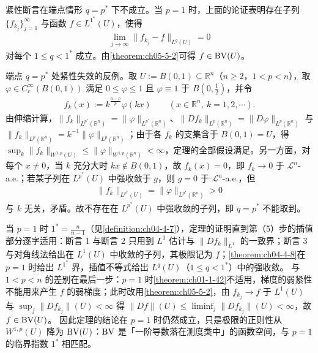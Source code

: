 ﻿\documentclass[../../main.tex]{subfiles}%
\begin{document}
\begin{remark}\label{remark:ch04-thm-4-11-端点}
紧性断言在端点情形 $q=p^*$ 下不成立。当 $p=1$ 时，上面的论证表明存在子列 $\{f_{k_j}\}_{j=1}^{\infty}$ 与函数 $f\in L^{1^*}(U)$，使得
\begin{align*}
\lim_{j\to\infty}\lVert f_{k_j}-f\rVert_{L^q(U)}=0
\end{align*}
对每个 $1\leqslant q<1^*$ 成立。由\cref{theorem:ch05-5-2}可得 $f\in\mathrm{BV}(U)$。%
\end{remark}

\begin{remark}\label{remark:ch04-thm-4-11-端点例}
端点 $q=p^*$ 处紧性失效的反例。取 $U:=B(0,1)\subseteq\mathbb{R}^n$（$n\geqslant2$，$1<p<n$），取 $\varphi\in C_c^\infty(B(0,1))$ 满足 $0\leqslant\varphi\leqslant1$ 且 $\varphi\equiv1$ 于 $B(0,\frac12)$，并令
\begin{align*}
f_k(x):=k^{\frac{n-p}{p}}\varphi(kx)\qquad(x\in\mathbb{R}^n,\ k=1,2,\cdots).
\end{align*}
由伸缩计算，$\lVert f_k\rVert_{L^{p^*}(\mathbb{R}^n)}=\lVert\varphi\rVert_{L^{p^*}(\mathbb{R}^n)}$、$\lVert Df_k\rVert_{L^p(\mathbb{R}^n)}=\lVert D\varphi\rVert_{L^p(\mathbb{R}^n)}$ 与 $\lVert f_k\rVert_{L^p(\mathbb{R}^n)}=k^{-1}\lVert\varphi\rVert_{L^p(\mathbb{R}^n)}$；由于各 $f_k$ 的支集含于 $B(0,1)=U$，得 $\sup_k\lVert f_k\rVert_{W^{1,p}(U)}\leqslant\lVert\varphi\rVert_{W^{1,p}(\mathbb{R}^n)}<\infty$，定理的全部假设满足。另一方面，对每个 $x\neq0$，当 $k$ 充分大时 $kx\notin B(0,1)$，故 $f_k(x)=0$，即 $f_k\to0$ 于 $\mathcal{L}^n$-a.e.；若某子列在 $L^{p^*}(U)$ 中强收敛于 $g$，则 $g=0$ 于 $\mathcal{L}^n$-a.e.，但
\begin{align*}
\lVert f_k\rVert_{L^{p^*}(U)}=\lVert\varphi\rVert_{L^{p^*}(\mathbb{R}^n)}>0
\end{align*}
与 $k$ 无关，矛盾。故不存在在 $L^{p^*}(U)$ 中强收敛的子列，即 $q=p^*$ 不能取到。
\end{remark}

\begin{remark}\label{remark:ch04-thm-4-11-端点其他}
当 $p=1$ 时 $1^*=\frac{n}{n-1}$（见\cref{definition:ch04-4-7}），定理的证明直到第（5）步的插值部分逐字适用：断言 1 与断言 2 只用到 $L^1$ 估计与 $\lVert Df_k\rVert_{L^1}$ 的一致界；断言 3 与对角线法给出在 $L^1(U)$ 中收敛的子列，其极限记为 $f$；\cref{theorem:ch04-4-8}在 $p=1$ 时给出 $L^{1^*}$ 界，插值不等式给出 $L^q(U)$（$1\leqslant q<1^*$）中的强收敛。%
与 $1<p<n$ 的差别在最后一步：$p=1$ 时\cref{theorem:ch01-1-42}不适用，梯度的弱紧性不能用来产生 $f$ 的弱梯度；此时改用\cref{theorem:ch05-5-2}，由 $f_{k_j}\to f$ 于 $L^1(U)$ 与 $\sup_j\lVert Df_{k_j}\rVert(U)<\infty$ 得 $\lVert Df\rVert(U)\leqslant\liminf_j\lVert Df_{k_j}\rVert(U)<\infty$，故 $f\in\mathrm{BV}(U)$。%
因此定理的结论在 $p=1$ 时仍然成立，只是极限的正则性从 $W^{1,p}(U)$ 降为 $\mathrm{BV}(U)$：$\mathrm{BV}$ 是「一阶导数落在测度类中」的函数空间，与 $p=1$ 的临界指数 $1^*$ 相匹配。
\end{remark}
\end{document}
